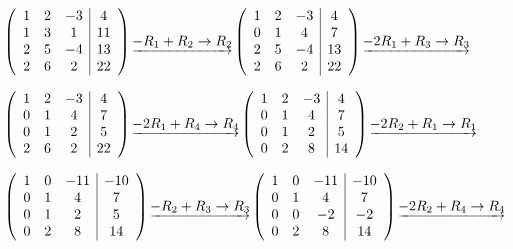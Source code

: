 \documentclass[12pt]{article}
\begin{document}
\begin{description}
\begin{enumerate}
\begin{math}
\left(
\begin{array}{c c c|c}
1 & 2 & -3 & 4  \\
1 & 3 & 1  & 11 \\
2 & 5 & -4 & 13 \\
2 & 6 & 2  & 22
\end{array}
\right)
\underrightarrow{-R_1 + R_2 \to R_2}
\left(
\begin{array}{c c c|c}
1 & 2 & -3 & 4  \\
0 & 1 & 4  & 7  \\
2 & 5 & -4 & 13 \\
2 & 6 & 2  & 22
\end{array}
\right)
\underrightarrow{-2 R_1 + R_3 \to R_3}
\end{math}

\begin{math}
\left(
\begin{array}{c c c|c}
1 & 2 & -3 & 4  \\
0 & 1 & 4  & 7  \\
0 & 1 & 2  & 5  \\
2 & 6 & 2  & 22
\end{array}
\right)
\underrightarrow{-2 R_1 + R_4 \to R_4}
\left(
\begin{array}{c c c|c}
1 & 2 & -3 & 4  \\
0 & 1 & 4  & 7  \\
0 & 1 & 2  & 5  \\
0 & 2 & 8  & 14
\end{array}
\right)
\underrightarrow{-2 R_2 + R_1 \to R_1}
\end{math}

\begin{math}
\left(
\begin{array}{c c c|c}
1 & 0 & -11 & -10 \\
0 & 1 & 4   & 7   \\
0 & 1 & 2   & 5   \\
0 & 2 & 8   & 14
\end{array}
\right)
\underrightarrow{-R_2 + R_3 \to R_3}
\left(
\begin{array}{c c c|c}
1 & 0 & -11 & -10 \\
0 & 1 & 4   & 7   \\
0 & 0 & -2  & -2  \\
0 & 2 & 8   & 14
\end{array}
\right)
\underrightarrow{-2 R_2 + R_4 \to R_4}
\end{math}


\end{enumerate}
\end{description}
\end{document}
